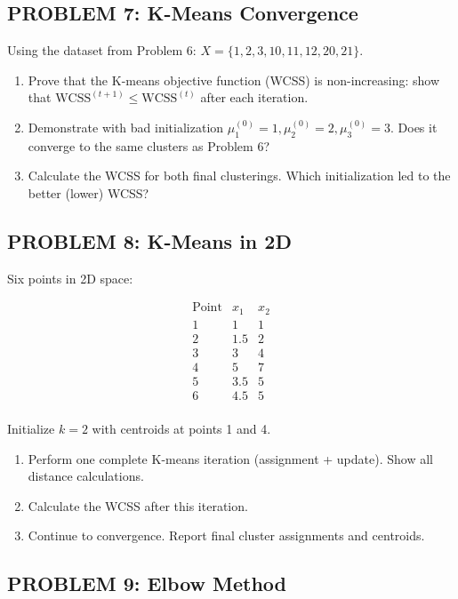 \documentclass[12pt]{article}
\begin{document}
\subsection*{PROBLEM 7: K-Means Convergence}

Using the dataset from Problem 6: \(X = \{1, 2, 3, 10, 11, 12, 20, 21\}\).

\begin{enumerate}
\item[(a)] Prove that the K-means objective function (WCSS) is non-increasing: show that \(\text{WCSS}^{(t+1)} \leq \text{WCSS}^{(t)}\) after each iteration.
\item[(b)] Demonstrate with bad initialization \(\mu_1^{(0)} = 1, \mu_2^{(0)} = 2, \mu_3^{(0)} = 3\). Does it converge to the same clusters as Problem 6?
\item[(c)] Calculate the WCSS for both final clusterings. Which initialization led to the better (lower) WCSS?
\end{enumerate}

\subsection*{PROBLEM 8: K-Means in 2D}

Six points in 2D space:

\[\begin{array}{c|cc}
\text{Point} & x_1 & x_2 \\
\hline
1 & 1 & 1 \\
2 & 1.5 & 2 \\
3 & 3 & 4 \\
4 & 5 & 7 \\
5 & 3.5 & 5 \\
6 & 4.5 & 5 \\
\end{array}\]

Initialize \(k = 2\) with centroids at points 1 and 4.

\begin{enumerate}
\item[(a)] Perform one complete K-means iteration (assignment + update). Show all distance calculations.
\item[(b)] Calculate the WCSS after this iteration.
\item[(c)] Continue to convergence. Report final cluster assignments and centroids.
\end{enumerate}

\subsection*{PROBLEM 9: Elbow Method}
\end{document}
